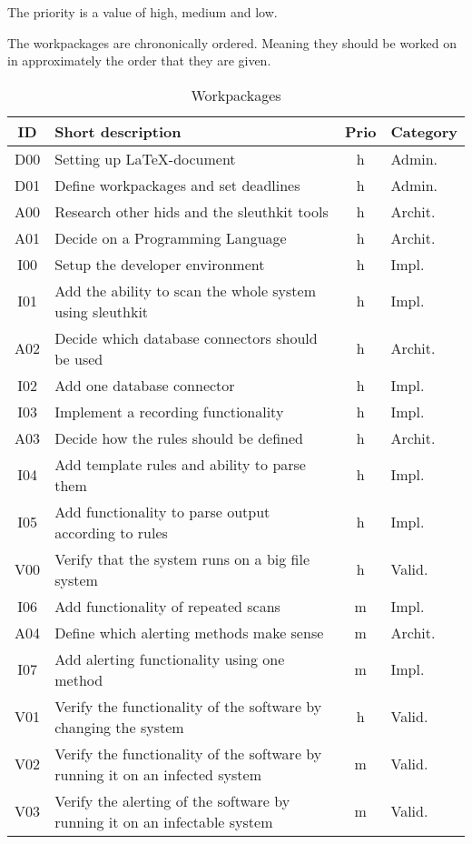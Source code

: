 The priority is a value of high, medium and low. 

The workpackages are chrononically ordered. Meaning they should be worked on in approximately the order that they are given. 

\begin{table}[h!]
  \begin{center}
    \caption{Workpackages}
    \label{tab:workpackages}
    \begin{tabular}{c|l|c|l}
      \textbf{ID} & \textbf{Short description} & \textbf{Prio} & \textbf{Category} \\
      \hline
		D00 & Setting up \LaTeX -document & h & Admin. \\
		D01 & Define workpackages and set deadlines & h & Admin. \\
		A00 & Research other \gls{hids} and the sleuthkit tools & h & Archit. \\
		A01 & Decide on a Programming Language & h & Archit. \\
		I00 & Setup the developer environment & h & Impl. \\
		I01 & Add the ability to scan the whole system using sleuthkit & h & Impl. \\
		A02 & Decide which database connectors should be used & h & Archit. \\
		I02 & Add one database connector & h & Impl. \\
		I03 & Implement a recording functionality & h & Impl. \\
		A03 & Decide how the rules should be defined & h & Archit. \\
		I04 & Add template rules and ability to parse them & h & Impl. \\
		I05 & Add functionality to parse output according to rules & h & Impl. \\
		V00 & Verify that the system runs on a big file system & h & Valid. \\
		I06 & Add functionality of repeated scans & m & Impl. \\
		A04 & Define which alerting methods make sense & m & Archit. \\ 
		I07 & Add alerting functionality using one method & m & Impl. \\
		V01 & Verify the functionality of the software by changing the system & h & Valid. \\
		V02 & Verify the functionality of the software by running it on an infected system & m & Valid. \\
		V03 & Verify the alerting of the software by running it on an infectable system & m & Valid. \\

\end{tabular}
\end{center}
\end{table}
